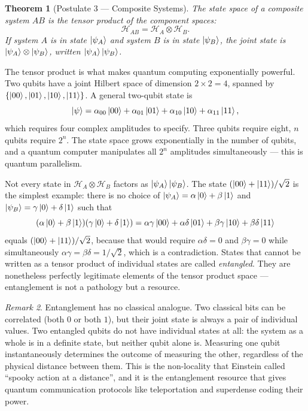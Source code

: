 \documentclass[12pt, a4paper, oneside]{report}
\theoremstyle{plain}
\newtheorem{theorem}{Theorem}[chapter]
\theoremstyle{definition}
\theoremstyle{remark}
\newtheorem{remark}[theorem]{Remark}
\newcommand{\Hcal}{\mathcal{H}}
\begin{document}
\begin{theorem}[Postulate 3 --- Composite Systems]
\label{post:composite}
The state space of a composite system $AB$ is the tensor product of the component spaces:
\[
  \Hcal_{AB} = \Hcal_A \otimes \Hcal_B.
\]
If system $A$ is in state $\ket{\psi_A}$ and system $B$ is in state $\ket{\psi_B}$,
the joint state is $\ket{\psi_A} \otimes \ket{\psi_B}$, written $\ket{\psi_A}\ket{\psi_B}$.
\end{theorem}

The tensor product is what makes quantum computing exponentially powerful. Two qubits have a
joint Hilbert space of dimension $2 \times 2 = 4$, spanned by $\{\ket{00}, \ket{01},
\ket{10}, \ket{11}\}$. A general two-qubit state is
\[
  \ket{\psi} = \alpha_{00}\ket{00} + \alpha_{01}\ket{01} + \alpha_{10}\ket{10} + \alpha_{11}\ket{11},
\]
which requires four complex amplitudes to specify. Three qubits require eight, $n$ qubits
require $2^n$. The state space grows exponentially in the number of qubits, and a quantum
computer manipulates all $2^n$ amplitudes simultaneously --- this is quantum parallelism.

Not every state in $\Hcal_A \otimes \Hcal_B$ factors as $\ket{\psi_A}\ket{\psi_B}$. The
state $(\ket{00} + \ket{11})/\sqrt{2}$ is the simplest example: there is no choice of
$\ket{\psi_A} = \alpha\ket{0} + \beta\ket{1}$ and $\ket{\psi_B} = \gamma\ket{0} +
\delta\ket{1}$ such that
\[
  (\alpha\ket{0}+\beta\ket{1})(\gamma\ket{0}+\delta\ket{1})
  = \alpha\gamma\ket{00} + \alpha\delta\ket{01} + \beta\gamma\ket{10} + \beta\delta\ket{11}
\]
equals $(\ket{00}+\ket{11})/\sqrt{2}$, because that would require $\alpha\delta = 0$ and
$\beta\gamma = 0$ while simultaneously $\alpha\gamma = \beta\delta = 1/\sqrt{2}$, which is
a contradiction. States that cannot be written as a tensor product of individual states are
called \emph{entangled}. They are nonetheless perfectly legitimate elements of the tensor
product space --- entanglement is not a pathology but a resource.

\begin{remark}
Entanglement has no classical analogue. Two classical bits can be correlated (both $0$ or
both $1$), but their joint state is always a pair of individual values. Two entangled qubits
do not have individual states at all: the system as a whole is in a definite state, but
neither qubit alone is. Measuring one qubit instantaneously determines the outcome of
measuring the other, regardless of the physical distance between them. This is the
non-locality that Einstein called ``spooky action at a distance'', and it is the entanglement
resource that gives quantum communication protocols like teleportation and superdense coding
their power.
\end{remark}
\end{document}
